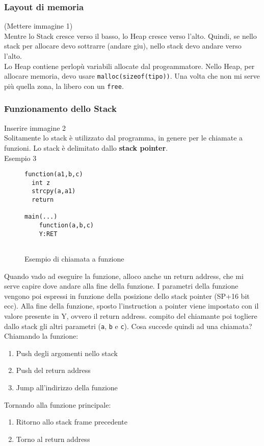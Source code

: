 \documentclass[a4paper,12pt]{article}
\begin{document}
\subsubsection{Layout di memoria}

(Mettere immagine 1)\\

Mentre lo Stack cresce verso il basso, lo Heap cresce verso l'alto. Quindi, se nello stack per allocare devo sottrarre (andare giu), nello stack devo andare verso l'alto.\\
Lo Heap contiene perlopù variabili allocate dal progeammatore. Nello Heap, per allocare memoria, devo usare \texttt{malloc(sizeof(tipo))}. Una volta che non mi serve più quella zona, la libero con un \texttt{free}.

\subsubsection{Funzionamento dello Stack}
Inserire immagine 2\\
Solitamente lo stack è utilizzato dal programma, in genere per le chiamate a funzioni. Lo stack è delimitato dallo \textbf{stack pointer}.
\\Esempio 3\\

\begin{figure}[H]
\begin{center}
\begin{lstlisting}
function(a1,b,c)
  int z
  strcpy(a,a1)
  return
  
main(...)
	function(a,b,c)
	Y:RET	
	
\end{lstlisting}
\end{center}
\caption{Esempio di chiamata a funzione}
\end{figure}
Quando vado ad eseguire la funzione, alloco anche un return address, che mi serve capire dove andare alla fine della funzione. I parametri della funzione vengono poi espressi in funzione della posizione dello stack pointer (SP+16 bit ecc). Alla fine della funzione, sposto l'instruction a pointer viene impostato con il valore presente in Y, ovvero il return address. \E compito del chiamante poi togliere dallo stack gli altri parametri (\texttt{a}, \texttt{b} e \texttt{c}).
Cosa succede quindi ad una chiamata?\\
Chiamando la funzione:
\begin{enumerate}
\item Push degli argomenti nello stack
\item Push del return address
\item Jump all'indirizzo della funzione
\end{enumerate}
Tornando alla funzione principale:
\begin{enumerate}
\item Ritorno allo stack frame precedente
\item Torno al return address
\end{enumerate}
\end{document}
